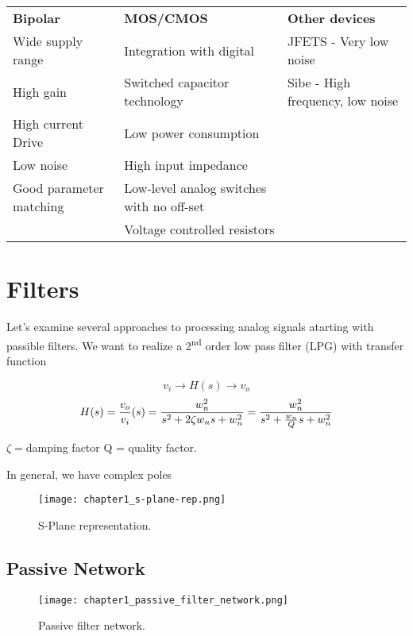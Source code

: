 \documentclass[11pt,fleqn]{book} %
\begin{document}
\begin{table}[h]
  \centering
  \begin{tabulary}{1\textwidth}{LLL}
    \textbf{Bipolar} & \textbf{MOS/CMOS} & \textbf{Other devices}\\
    Wide supply range & Integration with digital & JFETS - Very low noise \\
    High gain & Switched capacitor technology & Sibe - High frequency, low noise \\
    High current Drive & Low power consumption &  \\
    Low noise & High input impedance &  \\
    Good parameter matching & Low-level analog switches with no off-set &  \\
     & Voltage controlled resistors &  \\
  \end{tabulary}
\end{table}


\section{Filters}

Let's examine several approaches to processing analog signals atarting with passible filters. We want to realize a 2\textsuperscript{nd} order low pass filter (LPG) with transfer function

$$v_i \to H(s) \to v_o$$
$$H(s)=\frac{v_o}{v_i}(s)=\frac{w_n^2}{s^2+2\zeta w_ns+w_n^2}=\frac{w_n^2}{s^2+{w_n\over Q}s+w_n^2}$$

$\zeta = $damping factor
Q = quality factor.

In general, we have complex poles

\begin{figure}[h]
  \centering\texttt{[image: chapter1\_s-plane-rep.png]}
  \caption{S-Plane representation.}
\end{figure}


\subsection{Passive Network}

\begin{figure}[h]
  \centering\texttt{[image: chapter1\_passive\_filter\_network.png]}
  \caption{Passive filter network.}
\end{figure}
\end{document}

